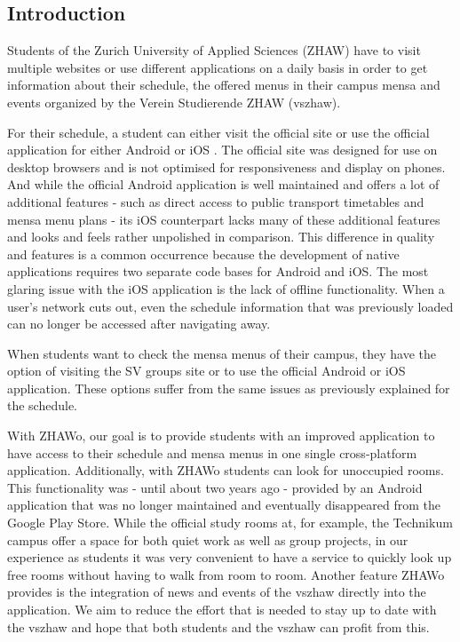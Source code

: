 \begin{markdown}
\section{Introduction} \label{introduction}

Students of the Zurich University of Applied Sciences (ZHAW) have to visit multiple websites or use different applications on a daily basis in order to get information about their schedule, the offered menus in their campus mensa and events organized by the Verein Studierende ZHAW (vszhaw).\par

For their schedule, a student can either visit the official site \cite{Stundenplan} or use the official application for either Android \cite{AppAndroid} or iOS \cite{AppIOS}. The official site was designed for use on desktop browsers and is not optimised for responsiveness and display on phones. And while the official Android application is well maintained and offers a lot of additional features - such as direct access to public transport timetables and mensa menu plans - its iOS counterpart lacks many of these additional features and looks and feels rather unpolished in comparison. This difference in quality and features is a common occurrence because the development of native applications requires two separate code bases for Android and iOS. The most glaring issue with the iOS application is the lack of offline functionality. When a user's network cuts out, even the schedule information that was previously loaded can no longer be accessed after navigating away.

When students want to check the mensa menus of their campus, they have the option of visiting the SV groups site or to use the official Android or iOS application. These options suffer from the same issues as previously explained for the schedule.


With ZHAWo, our goal is to provide students with an improved application to have access to their schedule and mensa menus in one single cross-platform application. Additionally, with ZHAWo students can look for unoccupied rooms. This functionality was - until about two years ago - provided by an Android application that was no longer maintained and eventually disappeared from the Google Play Store. While the official study rooms at, for example, the Technikum campus offer a space for both quiet work as well as group projects, in our experience as students it was very convenient to have a service to quickly look up free rooms without having to walk from room to room. Another feature ZHAWo provides is the integration of news and events of the vszhaw directly into the application. We aim to reduce the effort that is needed to stay up to date with the vszhaw and hope that both students and the vszhaw can profit from this.


\end{markdown}
